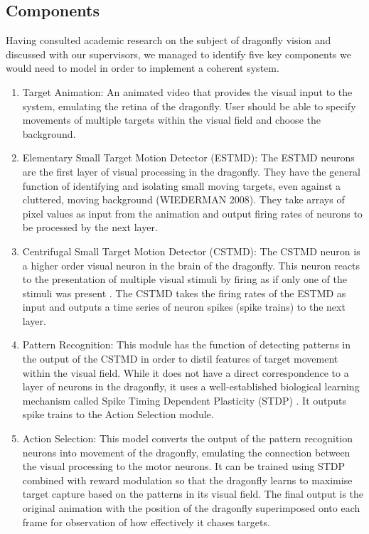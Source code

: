 \documentclass[a4paper,11pt]{article}
\begin{document}
\subsection{Components}

Having consulted academic research on the subject of dragonfly vision and discussed with our supervisors, we managed to identify five key components we would need to model in order to implement a coherent system. 

\begin{enumerate}
\item{Target Animation:} An animated video that provides the visual input to the system, emulating the retina of the dragonfly. User should be able to specify movements of multiple targets within the visual field and choose the background.
\item{Elementary Small Target Motion Detector (ESTMD):} The ESTMD neurons are the first layer of visual processing in the dragonfly. They have the general function of identifying and isolating small moving targets, even against a cluttered, moving background (WIEDERMAN 2008). They take arrays of pixel values as input from the animation and output firing rates of neurons to be processed by the next layer.
\item{Centrifugal Small Target Motion Detector (CSTMD):} The CSTMD neuron is a higher order visual neuron in the brain of the dragonfly. This neuron reacts to the presentation of multiple visual stimuli by firing as if only one of the stimuli was present \cite{w13}. The CSTMD takes the firing rates of the ESTMD as input and outputs a time series of neuron spikes (spike trains) to the next layer.
\item{Pattern Recognition:} This module has the function of detecting patterns in the output of the CSTMD in order to distil features of target movement within the visual field. While it does not have a direct correspondence to a layer of neurons in the dragonfly, it uses a well-established biological learning mechanism called Spike Timing Dependent Plasticity (STDP) \cite{stdp1}\cite{stdp2}. It outputs spike trains to the Action Selection module.
\item{Action Selection:} This model converts the output of the pattern recognition neurons into movement of the dragonfly, emulating the connection between the visual processing to the motor neurons. It can be trained using STDP combined with reward modulation so that the dragonfly learns to maximise target capture based on the patterns in its visual field. The final output is the original animation with the position of the dragonfly superimposed onto each frame for observation of how effectively it chases targets.
\end{enumerate}
\end{document}
